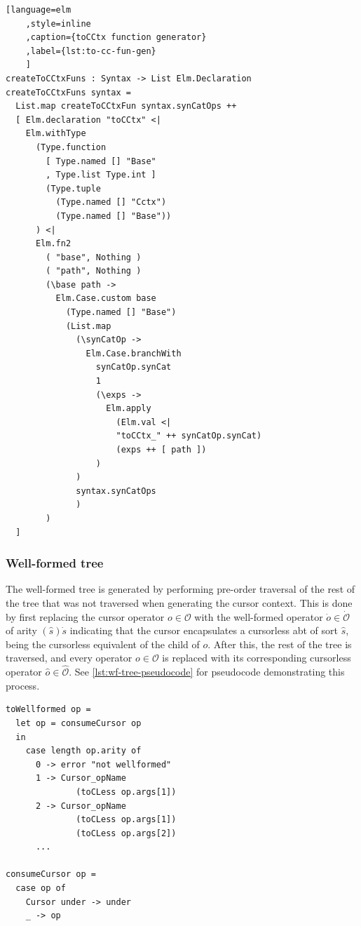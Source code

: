 \begin{minipage}{\textwidth}
  \begin{lstlisting}[language=elm
    ,style=inline
    ,caption={toCCtx function generator}
    ,label={lst:to-cc-fun-gen}
    ]
createToCCtxFuns : Syntax -> List Elm.Declaration
createToCCtxFuns syntax =
  List.map createToCCtxFun syntax.synCatOps ++ 
  [ Elm.declaration "toCCtx" <|
    Elm.withType
      (Type.function
        [ Type.named [] "Base"
        , Type.list Type.int ]
        (Type.tuple 
          (Type.named [] "Cctx") 
          (Type.named [] "Base"))
      ) <|
      Elm.fn2
        ( "base", Nothing )
        ( "path", Nothing )
        (\base path ->
          Elm.Case.custom base
            (Type.named [] "Base")
            (List.map
              (\synCatOp ->
                Elm.Case.branchWith
                  synCatOp.synCat
                  1
                  (\exps ->
                    Elm.apply 
                      (Elm.val <|
                      "toCCtx_" ++ synCatOp.synCat) 
                      (exps ++ [ path ])
                  )
              )
              syntax.synCatOps
              )
        )
  ]
\end{lstlisting}
\end{minipage}

\subsubsection{Well-formed tree}

The well-formed tree is generated by performing pre-order traversal of the
rest of the tree that was not traversed when generating the cursor context.
This is done by first replacing the cursor operator $o \in \mathcal{O}$ with the well-formed operator
$\dot{o} \in \dot{\mathcal{O}}$ of arity $(\hat{s})\dot{s}$ indicating that the
cursor encapsulates a cursorless abt of sort $\hat{s}$, being the cursorless equivalent of the child of $o$.
After this, the rest of the tree is traversed, and every operator $o \in \mathcal{O}$
is replaced with its corresponding cursorless operator $\hat{o} \in \hat{\mathcal{O}}$.
See \cref{lst:wf-tree-pseudocode} for pseudocode demonstrating this process.

\begin{minipage}{\textwidth}
  \begin{lstlisting}[caption={Pseudocode for generating well-formed tree},label={lst:wf-tree-pseudocode}, style=inline]
toWellformed op =
  let op = consumeCursor op
  in
    case length op.arity of
      0 -> error "not wellformed"
      1 -> Cursor_opName
              (toCLess op.args[1])
      2 -> Cursor_opName
              (toCLess op.args[1])
              (toCLess op.args[2])
      ...

consumeCursor op =
  case op of
    Cursor under -> under
    _ -> op
\end{lstlisting}
\end{minipage}

